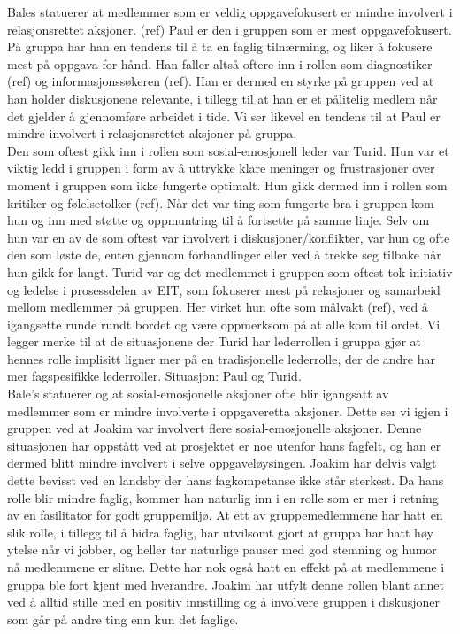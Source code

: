 Bales statuerer at medlemmer som er veldig oppgavefokusert er mindre involvert i 
relasjonsrettet aksjoner. (ref) Paul er den i gruppen som er mest oppgavefokusert. 
På gruppa har han en tendens til å ta en faglig tilnærming, og liker å fokusere mest 
på oppgava for hånd. Han faller altså oftere inn i rollen som diagnostiker (ref) og 
informasjonssøkeren (ref). Han er dermed en styrke på gruppen ved at han holder 
diskusjonene relevante, i tillegg til at han er et pålitelig medlem når det gjelder 
å gjennomføre arbeidet i tide. Vi ser likevel en tendens til at Paul er mindre involvert 
i relasjonsrettet aksjoner på gruppa. \\

Den som oftest gikk inn i rollen som sosial-emosjonell leder var Turid. Hun var et viktig 
ledd i gruppen i form av å uttrykke klare meninger og frustrasjoner over moment i gruppen
som ikke fungerte optimalt. Hun gikk dermed inn i rollen som kritiker og følelsetolker (ref).
Når det var ting som fungerte bra i gruppen kom hun og inn med støtte og oppmuntring til å 
fortsette på samme linje. Selv om hun var en av de som oftest var involvert i diskusjoner/konflikter,
var hun og ofte den som løste de, enten gjennom forhandlinger eller ved å trekke seg tilbake
når hun gikk for langt. Turid var og det medlemmet i gruppen som oftest tok initiativ og ledelse 
i prosessdelen av EIT, som fokuserer mest på relasjoner og samarbeid mellom medlemmer på gruppen. 
Her virket hun ofte som målvakt (ref), ved å igangsette runde rundt bordet og være oppmerksom på 
at alle kom til ordet. Vi legger merke til at de situasjonene der Turid har
lederrollen i gruppa gjør at hennes rolle implisitt ligner mer på en tradisjonelle lederrolle, der de
andre har mer fagspesifikke lederroller. 
Situasjon: Paul og Turid.\\

Bale's statuerer og at sosial-emosjonelle aksjoner ofte blir igangsatt av medlemmer som er 
mindre involverte i oppgaveretta aksjoner. Dette ser vi igjen i gruppen ved at Joakim var 
involvert flere sosial-emosjonelle aksjoner. Denne situasjonen har oppstått ved at prosjektet 
er noe utenfor hans fagfelt, og han er dermed blitt mindre involvert i selve oppgaveløysingen. 
Joakim har delvis valgt dette bevisst ved en landsby der hans fagkompetanse ikke
står sterkest. Da hans rolle blir mindre faglig, kommer han naturlig inn i en
rolle som er mer i retning av en fasilitator for godt gruppemiljø. At ett av
gruppemedlemmene har hatt en slik rolle, i tillegg til å bidra faglig, har
utvilsomt gjort at gruppa har hatt høy ytelse når vi jobber, og heller tar
naturlige pauser med god stemning og humor nå medlemmene er slitne. Dette har
nok også hatt en effekt på at medlemmene i gruppa ble fort kjent med hverandre.
Joakim har utfylt denne rollen blant annet ved å alltid stille med en positiv innstilling og 
å involvere gruppen i diskusjoner som går på andre ting enn kun det faglige.\\

